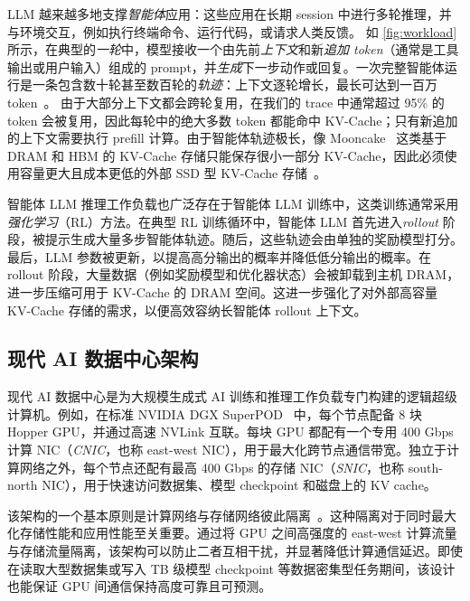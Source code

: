 LLM 越来越多地支撑\emph{智能体}应用：这些应用在长期 session 中进行多轮推理，并与环境交互，例如执行终端命令、运行代码，或请求人类反馈。
如 \autoref{fig:workload} 所示，在典型的\emph{一轮}中，模型接收一个由先前\emph{上下文}和新\emph{追加 token}（通常是工具输出或用户输入）组成的 prompt，并\emph{生成}下一步动作或回复。一次完整智能体运行是一条包含数十轮甚至数百轮的\emph{轨迹}：上下文逐轮增长，最长可达到一百万 token~\cite{claudeopus46, googlegemini3pro}。
由于大部分上下文都会跨轮复用，在我们的 trace 中通常超过 95\% 的 token 会被复用，因此每轮中的绝大多数 token 都能命中 KV-Cache；只有新追加的上下文需要执行 prefill 计算。由于智能体轨迹极长，像 Mooncake~\cite{FAST25:Mooncake} 这类基于 DRAM 和 HBM 的 KV-Cache 存储只能保存很小一部分 KV-Cache，因此必须使用容量更大且成本更低的外部 SSD 型 KV-Cache 存储~\cite{3FS}。

智能体 LLM 推理工作负载也广泛存在于智能体 LLM 训练中，这类训练通常采用\emph{强化学习}（RL）方法。在典型 RL 训练循环中，智能体 LLM 首先进入\emph{rollout} 阶段，被提示生成大量多步智能体轨迹。随后，这些轨迹会由单独的奖励模型打分。最后，LLM 参数被更新，以提高高分输出的概率并降低低分输出的概率。在 rollout 阶段，大量数据（例如奖励模型和优化器状态）会被卸载到主机 DRAM，进一步压缩可用于 KV-Cache 的 DRAM 空间。这进一步强化了对外部高容量 KV-Cache 存储的需求，以便高效容纳长智能体 rollout 上下文。

\subsection{现代 AI 数据中心架构}

现代 AI 数据中心是为大规模生成式 AI 训练和推理工作负载专门构建的逻辑超级计算机。例如，在标准 NVIDIA DGX SuperPOD~\cite{nvidia2023superpod} 中，每个节点配备 8 块 Hopper GPU，并通过高速 NVLink 互联。每块 GPU 都配有一个专用 400 Gbps 计算 NIC（\emph{CNIC}，也称 east-west NIC），用于最大化跨节点通信带宽。独立于计算网络之外，每个节点还配有最高 400 Gbps 的存储 NIC（\emph{SNIC}，也称 south-north NIC），用于快速访问数据集、模型 checkpoint 和磁盘上的 KV cache。

该架构的一个基本原则是计算网络与存储网络彼此隔离~\cite{zhao2025insights}。这种隔离对于同时最大化存储性能和应用性能至关重要。通过将 GPU 之间高强度的 east-west 计算流量与存储流量隔离，该架构可以防止二者互相干扰，并显著降低计算通信延迟。即使在读取大型数据集或写入 TB 级模型 checkpoint 等数据密集型任务期间，该设计也能保证 GPU 间通信保持高度可靠且可预测。
